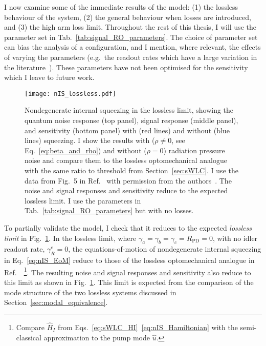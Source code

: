 I now examine some of the immediate results of the model: (1) the lossless behaviour of the system, (2) the general behaviour when losses are introduced, and (3) the high arm loss limit.
Throughout the rest of this thesis, I will use the parameter set in Tab.~\ref{tab:signal_RO_parameters}. The choice of parameter set can bias the analysis of a configuration, and I mention, where relevant, the effects of varying the parameters (e.g.\ the readout rates which have a large variation in the literature~\cite{}). These parameters have not been optimised for the sensitivity which I leave to future work. %

\label{sec:nIS_lossless_limit}

\begin{figure}
    \centering
    \texttt{[image: nIS\_lossless.pdf]}
    \caption{Nondegenerate internal squeezing in the lossless limit, showing the quantum noise response (top panel), signal response (middle panel), and sensitivity (bottom panel) with (red lines) and without (blue lines) squeezing. I show the results with ($\rho\neq0$, see Eq.~\ref{eq:beta_and_rho}) and without ($\rho=0$) radiation pressure noise and compare them to the lossless optomechanical analogue with the same ratio to threshold from Section~\ref{sec:sWLC}. I use the data from Fig.~5 in Ref.~\cite{liBroadbandSensitivityImprovement2020} with permission from the authors~\cite{xiangLiPersonalCommunication}. The noise and signal responses and sensitivity reduce to the expected lossless limit. I use the parameters in Tab.~\ref{tab:signal_RO_parameters} but with no losses.}
    \label{fig:nIS_lossless}
\end{figure}

To partially validate the model, I check that it reduces to the expected \emph{lossless limit} in Fig.~\ref{fig:nIS_lossless}.
In the lossless limit, where $\gamma_a=\gamma_b=\gamma_c=R_\text{PD}=0$, with no idler readout rate, $\gamma^c_R=0$, the equations-of-motion of nondegenerate internal squeezing in Eq.~\ref{eq:nIS_EoM} reduce to those of the lossless optomechanical analogue in Ref.~\cite{liBroadbandSensitivityImprovement2020}~\footnote{Compare $\hat H_I$ from Eqs.~\ref{eq:sWLC_HI}~\ref{eq:nIS_Hamiltonian} with the semi-classical approximation to the pump mode $\hat u$.}. The resulting noise and signal responses and sensitivity also reduce to this limit as shown in Fig.~\ref{fig:nIS_lossless}. This limit is expected from the comparison of the mode structure of the two lossless systems discussed in Section~\ref{sec:modal_equivalence}.

